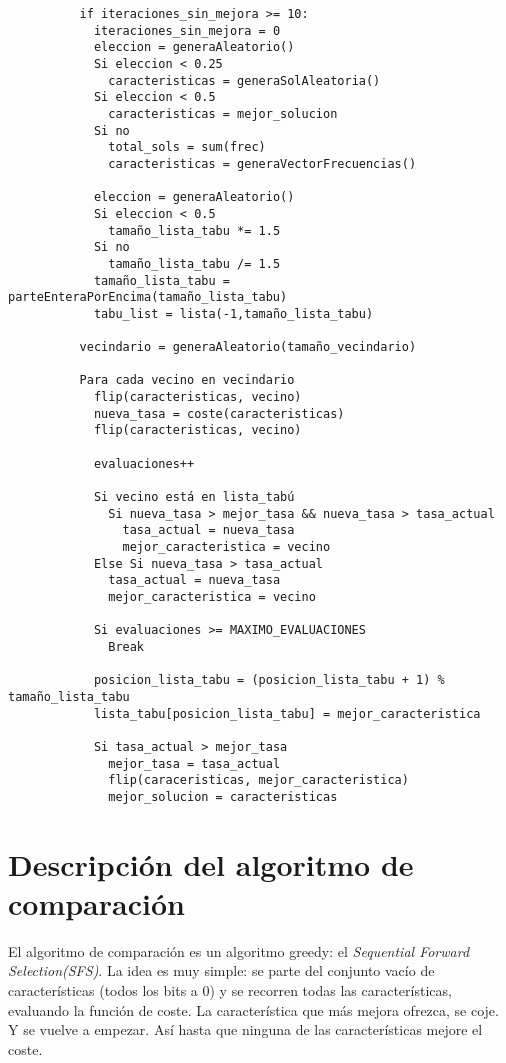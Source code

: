 \documentclass[a4paper, 11pt]{article}
\begin{document}
\begin{itemize}
\begin{verbatim}
          if iteraciones_sin_mejora >= 10:
            iteraciones_sin_mejora = 0
            eleccion = generaAleatorio()
            Si eleccion < 0.25
              caracteristicas = generaSolAleatoria()
            Si eleccion < 0.5
              caracteristicas = mejor_solucion
            Si no
              total_sols = sum(frec)
              caracteristicas = generaVectorFrecuencias()

            eleccion = generaAleatorio()
            Si eleccion < 0.5
              tamaño_lista_tabu *= 1.5
            Si no
              tamaño_lista_tabu /= 1.5
            tamaño_lista_tabu = parteEnteraPorEncima(tamaño_lista_tabu)
            tabu_list = lista(-1,tamaño_lista_tabu)

          vecindario = generaAleatorio(tamaño_vecindario)

          Para cada vecino en vecindario
            flip(caracteristicas, vecino)
            nueva_tasa = coste(caracteristicas)
            flip(caracteristicas, vecino)

            evaluaciones++

            Si vecino está en lista_tabú
              Si nueva_tasa > mejor_tasa && nueva_tasa > tasa_actual
                tasa_actual = nueva_tasa
                mejor_caracteristica = vecino
            Else Si nueva_tasa > tasa_actual
              tasa_actual = nueva_tasa
              mejor_caracteristica = vecino

            Si evaluaciones >= MAXIMO_EVALUACIONES
              Break

            posicion_lista_tabu = (posicion_lista_tabu + 1) % tamaño_lista_tabu
            lista_tabu[posicion_lista_tabu] = mejor_caracteristica

            Si tasa_actual > mejor_tasa
              mejor_tasa = tasa_actual
              flip(caraceristicas, mejor_caracteristica)
              mejor_solucion = caracteristicas
      \end{verbatim}
    \end{itemize}
  \section{Descripción del algoritmo de comparación}
    El algoritmo de comparación es un algoritmo greedy: el \emph{Sequential Forward Selection(SFS)}. La idea es muy simple: se parte del conjunto vacío de características (todos los bits a 0) y se recorren todas las características, evaluando la función de coste. La característica que más mejora ofrezca, se coje. Y se vuelve a empezar. Así hasta que ninguna de las características mejore el coste.
\end{document}
